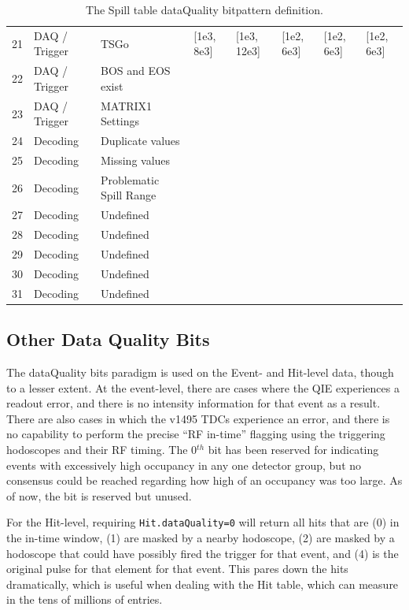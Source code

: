 \begin{table}
\begin{tabular}{llllllll}
		21 & DAQ / Trigger & TSGo & [1e3, 8e3] & [1e3, 12e3] & [1e2, 6e3] & [1e2, 6e3] & [1e2, 6e3] \\
		22 & DAQ / Trigger & BOS and EOS exist & & & & & \\
		23 & DAQ / Trigger & MATRIX1 Settings & & & & & \\
		24 & Decoding & Duplicate values & & & & & \\
		25 & Decoding & Missing values & & & & & \\
		26 & Decoding & Problematic Spill Range & & & & & \\
		27 & Decoding & Undefined & & & & & \\
		28 & Decoding & Undefined & & & & & \\
		29 & Decoding & Undefined & & & & & \\
		30 & Decoding & Undefined & & & & & \\
		31 & Decoding & Undefined & & & & & \\ \bottomrule
	\end{tabular}
	\caption{The Spill table dataQuality bitpattern definition.}
	\label{tab:spill-dq}
\end{table}

\subsection{Other Data Quality Bits}

The dataQuality bits paradigm is used on the Event- and Hit-level data, though to a lesser extent. At the event-level, there are cases where the QIE experiences a readout error, and there is no intensity information for that event as a result. There are also cases in which the v1495 TDCs experience an error, and there is no capability to perform the precise ``RF in-time'' flagging using the triggering hodoscopes and their RF timing. The 0$^{th}$ bit has been reserved for indicating events with excessively high occupancy in any one detector group, but no consensus could be reached regarding how high of an occupancy was too large. As of now, the bit is reserved but unused.

For the Hit-level, requiring \verb|Hit.dataQuality=0| will return all hits that are (0) in the in-time window, (1) are masked by a nearby hodoscope, (2) are masked by a hodoscope that could have possibly fired the trigger for that event, and (4) is the original pulse for that element for that event. This pares down the hits dramatically, which is useful when dealing with the Hit table, which can measure in the tens of millions of entries.

